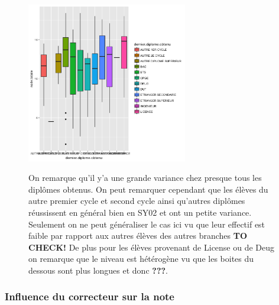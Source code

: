\documentclass[]{report}
\begin{document}
\begin{figure}[h!]
	\begin{minipage}{.5\textwidth}
	\includegraphics[width=70mm]{Figures/Notes/diplome_resultat.png}
	\label{fig:formation_resultat}	
	\end{minipage}%
	\hspace{0.08\linewidth}
	\begin{minipage}{.5\textwidth}
		On remarque qu'il y'a une grande variance chez  presque tous les diplômes obtenus. On peut remarquer cependant que les élèves du autre premier cycle et second cycle ainsi qu'autres diplômes réussissent en général bien en SY02 et ont un petite variance. Seulement on ne peut généraliser le cas ici vu que leur effectif est faible par rapport aux autres élèves des autres branches \textbf{TO CHECK!} De plus pour les élèves provenant de License ou de Deug on remarque que le niveau est hétérogène vu que les boites du dessous sont plus longues et donc \textbf{???}. 
	\end{minipage}
\end{figure}

\subsubsection{Influence du correcteur sur la note}
\end{document}
